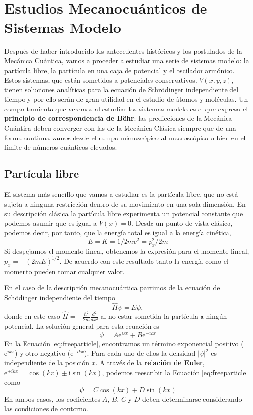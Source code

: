 \chapter{Estudios Mecanocuánticos de Sistemas Modelo}
Después de haber introducido los antecedentes históricos y los
postulados de la Mecánica Cuántica, vamos a proceder a 
estudiar una serie de sistemas modelo: la partícula libre, la
partícula en una caja de potencial y el oscilador armónico.
Estos sistemas, que están sometidos a potenciales conservativos,
$V(x,y,z)$, tienen soluciones analíticas para la ecuación 
de Schrödinger independiente del tiempo y por ello serán de gran
utilidad en el estudio de átomos y moléculas. Un comportamiento
que veremos al estudiar los sistemas modelo es el que expresa
el \textbf{principio de correspondencia de Böhr}:
las predicciones de la Mecánica Cuántica deben converger con 
las de la Mecánica Clásica siempre que de una forma continua vamos 
desde el campo microscópico al macroscópico o bien en el límite
de números cuánticos elevados.

\section{Partícula libre}
El sistema más sencillo que vamos a estudiar es la partícula libre,
que no está sujeta a ninguna restricción dentro de su movimiento
en una sola dimensión. En su descripción clásica la partícula libre
experimenta un potencial constante que podemos asumir que es igual a
$V(x)=0$. Desde un punto de vista clásico, podemos decir, por tanto,
que la energía total es igual a la energía cinética,
\begin{equation}
    E=K=1/2mv^2=p_x^2/2m
\end{equation}
Si despejamos el momento lineal, obtenemos la expresión para el
momento lineal, $p_x=\pm(2mE)^{1/2}$. De acuerdo con este resultado
tanto la energía como el momento pueden tomar cualquier valor.

En el caso de la descripción mecanocuántica partimos de 
la ecuación de Schödinger independiente del tiempo
\begin{equation}
    \hat{H}\psi=E\psi,
\end{equation}
donde en este caso $\hat{H}=-\frac{\hbar^2}{2m}\frac{d^2}{dx^2}$ al
no estar sometida la partícula a ningún potencial. La solución
general para esta ecuación es
\begin{equation}
    \psi = A\mathrm{e}^{ikx}+ B\mathrm{e}^{-ikx}\label{eq:freeparticle}
\end{equation}
En la Ecuación \ref{eq:freeparticle}, encontramos un término
exponencial positivo ($\mathrm{e}^{ikx}$) y otro negativo 
($\mathrm{e}^{-ikx}$). Para cada uno de ellos la densidad 
$|\psi|^2$ es independiente de la posición $x$.
A través de la \textbf{relación de Euler}, 
$\mathrm{e}^{\pm ikx}=\cos(kx)\pm\mathrm{i}\sin(kx)$, podemos reescribir
la Ecuación \ref{eq:freeparticle} como
\begin{equation}
    \psi=C\cos(kx) + D\sin(kx) \label{eq:freepangular}
\end{equation}
En ambos casos, los coeficientes
$A$, $B$, $C$ y $D$ deben determinarse considerando las condiciones
de contorno.

